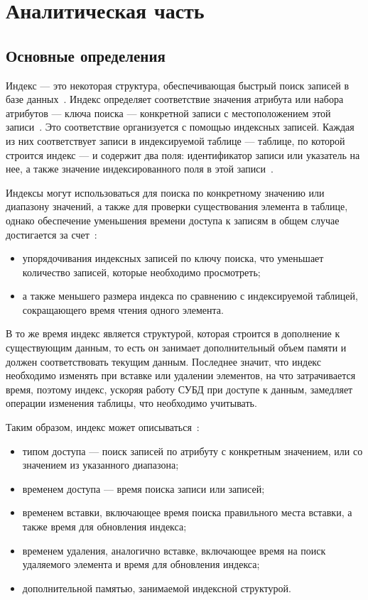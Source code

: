 \chapter{Аналитическая часть\label{analysis}}

\section{Основные определения}

Индекс --- это некоторая структура, обеспечивающая быстрый поиск
записей в базе данных~\cite{amur}. Индекс определяет соответствие значения
атрибута или набора атрибутов --- ключа поиска --- конкретной
записи с местоположением этой записи~\cite{ship}. Это соответствие организуется
с помощью индексных записей. Каждая из них соответствует записи в
индексируемой таблице --- таблице, по которой строится индекс --- и
содержит два поля: идентификатор записи или указатель на нее, а также значение
индексированного поля в этой записи~\cite{syore}.

Индексы могут использоваться для поиска по конкретному значению или диапазону
значений, а также для проверки существования элемента в таблице, однако
обеспечение уменьшения времени доступа к записям в общем случае достигается за
счет~\cite{ship}:
\begin{itemize}
    \item упорядочивания индексных записей по ключу поиска, что уменьшает
        количество записей, которые необходимо просмотреть;
    \item а также меньшего размера индекса по сравнению с индексируемой
        таблицей, сокращающего время чтения одного элемента.
\end{itemize}

В то же время индекс является структурой, которая строится в дополнение к
существующим данным, то есть он занимает дополнительный объем памяти и должен
соответствовать текущим данным.  Последнее значит, что индекс необходимо
изменять при вставке или удалении элементов, на что затрачивается время, поэтому
индекс, ускоряя работу СУБД при доступе к данным, замедляет операции изменения
таблицы, что необходимо учитывать\cite{osip}.

Таким образом, индекс может описываться~\cite{ship}:
\begin{itemize}
    \item типом доступа --- поиск записей по атрибуту с конкретным
        значением, или со значением из указанного диапазона;
    \item временем доступа --- время поиска записи или записей;
    \item временем вставки, включающее время поиска правильного места
        вставки, а также время для обновления индекса;
    \item временем удаления, аналогично вставке, включающее время на поиск
        удаляемого элемента и время для обновления индекса;
    \item дополнительной памятью, занимаемой индексной структурой.
\end{itemize}

